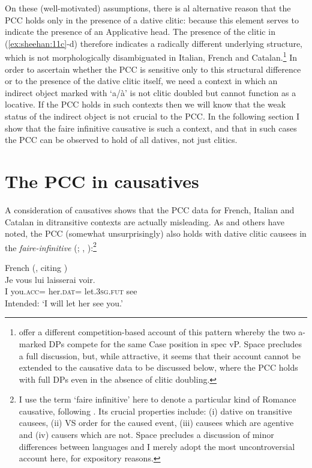 \documentclass[output=paper,colorlinks,citecolor=brown,nonflat]{./langscibook}
\begin{document}
On these (well-motivated) assumptions, there is al alternative reason that the PCC holds only in the presence of a dative clitic:  because this element serves to indicate the presence of an Applicative head. The presence of the clitic in (\ref{ex:sheehan:11c}-d) therefore indicates a radically different underlying structure, which is not morphologically disambiguated in Italian, French and Catalan.\footnote{\citet{OrmazabalRomero2013Borealis} offer a different competition-based account of this pattern whereby the two a-marked DPs compete for the same Case position in spec vP. Space precludes a full discussion, but, while attractive, it seems that their account cannot be extended to the causative data to be discussed below, where the PCC holds with full DPs even in the absence of clitic doubling.} In order to ascertain whether the PCC is sensitive only to this structural difference or to the presence of the dative clitic itself, we need a context in which an indirect object marked with ‘a/à’ is not clitic doubled but cannot function as a locative. If the PCC holds in such contexts then we will know that the weak status of the indirect object is not crucial to the PCC. In the following section I show that the faire infinitive causative is such a context, and that in such cases the PCC can be observed to hold of all datives, not just clitics.

\section{The PCC in causatives}\label{sec:sheehan:3}

A consideration of causatives shows that the PCC data for French, Italian and Catalan in ditransitive contexts are actually misleading. As \citet{Bonet1991} and others have noted, the PCC (somewhat unsurprisingly) also holds with dative clitic causees in the \textit{faire-infinitive} (\citealt{Postal1981}; \citealt{Quicoli1984}, \citealt{Rezac2008}):\footnote{I use the term ‘faire infinitive’ here to denote a particular kind of Romance causative, following \citet{Kayne1975}. Its crucial properties include: (i) dative on transitive causees, (ii) VS order for the caused event, (iii) causees which are agentive and (iv) causers which are not. Space precludes a discussion of minor differences between languages and I merely adopt the most uncontroversial account here, for expository reasons.} 

\ea%
    \label{ex:sheehan:13}
    French (\citealt[66]{Rezac2008}, citing \citealt{Postal1981, Quicoli1984})\\
    \gll    *Je   vous     lui           laisserai   voir.\\
            I      you.\textsc{acc}=   her.\textsc{dat=}   let.3\textsc{sg}.\textsc{fut}    see\\
    \glt    Intended: ‘I will let her see you.'
\z
\end{document}
